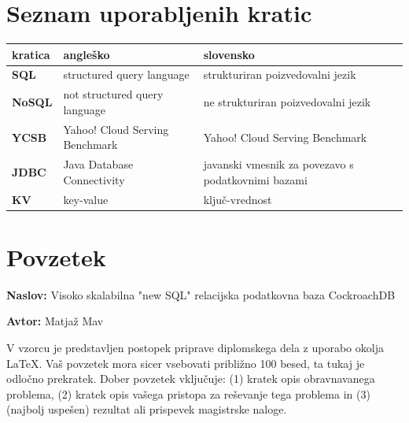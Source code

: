 \documentclass[a4paper, 12pt]{book}
\newcommand{\ttitle}{Visoko skalabilna "new SQL" relacijska podatkovna baza CockroachDB}
\newcommand{\tauthor}{Matjaž Mav}
\newcommand{\clearemptydoublepage}{\newpage{\pagestyle{empty}\cleardoublepage}}
\begin{document}
\vspace{2cm}


\clearemptydoublepage


\pagestyle{empty}
\def\thepage{}%
\tableofcontents{}


\clearemptydoublepage


\chapter*{Seznam uporabljenih kratic}  %

\noindent\begin{tabular}{p{}|p{}|p{}}
  {\bf kratica} & {\bf angleško}                        & {\bf slovensko} \\ \hline
  {\bf SQL}     & structured query language             & strukturiran poizvedovalni jezik \\
  {\bf NoSQL}     & not structured query language             & ne strukturiran poizvedovalni jezik \\
  {\bf YCSB}    & Yahoo! Cloud Serving Benchmark        & Yahoo! Cloud Serving Benchmark \\
  {\bf JDBC}    & Java Database Connectivity            & javanski vmesnik za povezavo s podatkovnimi bazami \\
  {\bf KV}    & key-value            & ključ-vrednost \\
\end{tabular}


\clearemptydoublepage

\chapter*{Povzetek}

\noindent\textbf{Naslov:} \ttitle
\bigskip

\noindent\textbf{Avtor:} \tauthor
\bigskip

\noindent V vzorcu je predstavljen postopek priprave diplomskega dela z uporabo okolja \LaTeX. Vaš povzetek mora sicer vsebovati približno 100 besed, ta tukaj je odločno prekratek.
Dober povzetek vključuje: (1) kratek opis obravnavanega problema, (2) kratek opis vašega pristopa za reševanje tega problema in (3) (najbolj uspešen) rezultat ali prispevek magistrske naloge.
\end{document}
